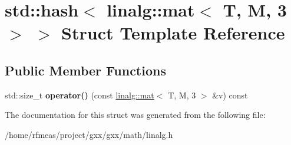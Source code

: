 \hypertarget{structstd_1_1hash_3_01linalg_1_1mat_3_01T_00_01M_00_013_01_4_01_4}{}\section{std\+:\+:hash$<$ linalg\+:\+:mat$<$ T, M, 3 $>$ $>$ Struct Template Reference}
\label{structstd_1_1hash_3_01linalg_1_1mat_3_01T_00_01M_00_013_01_4_01_4}
\subsection*{Public Member Functions}
\begin{DoxyCompactItemize}
\item 
std\+::size\+\_\+t {\bfseries operator()} (const \hyperlink{structlinalg_1_1mat}{linalg\+::mat}$<$ T, M, 3 $>$ \&v) const \hypertarget{structstd_1_1hash_3_01linalg_1_1mat_3_01T_00_01M_00_013_01_4_01_4_aad531b3555d442804533480e86e53e09}{}\label{structstd_1_1hash_3_01linalg_1_1mat_3_01T_00_01M_00_013_01_4_01_4_aad531b3555d442804533480e86e53e09}

\end{DoxyCompactItemize}


The documentation for this struct was generated from the following file\+:\begin{DoxyCompactItemize}
\item 
/home/rfmeas/project/gxx/gxx/math/linalg.\+h\end{DoxyCompactItemize}
